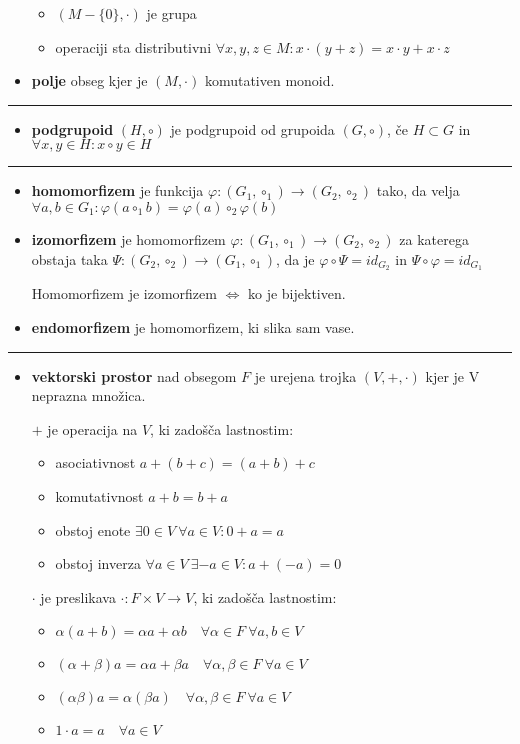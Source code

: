 \documentclass[a4paper,landscape]{article}
\begin{document}
\begin{multicols}{3}
\begin{itemize}
\begin{itemize}
        \item $(M-\{0\},\cdot)$ je grupa
        \item operaciji sta distributivni $\forall x,y,z \in M : x\cdot (y+z) = x\cdot y + x \cdot z$
    \end{itemize}
    \item \textbf{polje} obseg kjer je $(M,\cdot)$ komutativen monoid.
\end{itemize}
\noindent\rule{2cm}{0.4pt}
\begin{itemize}
    \item \textbf{podgrupoid} $(H, \circ)$ je podgrupoid od grupoida $(G, \circ)$, če $H \subset G$ in $\forall x,y \in H : x \circ y \in H$
\end{itemize}
\noindent\rule{2cm}{0.4pt}
\begin{itemize}
    \item \textbf{homomorfizem} je funkcija $\varphi : (G_1, \circ_1) \to (G_2, \circ_2)$ tako, da velja $\forall a,b \in G_1 : \varphi (a \circ_1 b) = \varphi (a) \circ_2 \varphi(b)$
    \item \textbf{izomorfizem} je homomorfizem $\varphi : (G_1, \circ_1) \to (G_2, \circ_2)$ za katerega obstaja taka $\Psi : (G_2, \circ_2) \to (G_1, \circ_1)$, da je $\varphi \circ \Psi = id_{G_2}$ in $\Psi \circ \varphi = id_{G_1}$
    
    Homomorfizem je izomorfizem $\Leftrightarrow$ ko je bijektiven.

    \item \textbf{endomorfizem} je homomorfizem, ki slika sam vase.
\end{itemize}
\noindent\rule{2cm}{0.4pt}
\begin{itemize}
    \item \textbf{vektorski prostor} nad obsegom $F$ je urejena trojka $(V, +, \cdot)$ kjer je V neprazna množica.

    $+$ je operacija na $V$, ki zadošča lastnostim:
    \begin{itemize}
        \item asociativnost $a+(b+c) = (a+b)+c$
        \item komutativnost $a+b = b+a$
        \item obstoj enote $\exists 0 \in V \ \forall a \in V : 0+a = a$
        \item obstoj inverza $\forall a \in V \ \exists -a \in V : a+(-a) = 0$
    \end{itemize}
    $\cdot$ je preslikava $\cdot : F\times V \to V$, ki zadošča lastnostim:
    \begin{itemize}
        \item $\alpha (a+b) = \alpha a + \alpha b \quad \forall \alpha \in F \ \forall a,b \in V$
        \item $(\alpha + \beta)a = \alpha a + \beta a \quad \forall \alpha, \beta \in F \ \forall a\in V$
        \item $(\alpha \beta)a = \alpha (\beta a) \quad \forall \alpha, \beta \in F \ \forall a\in V$
        \item $1 \cdot a = a \quad \forall a \in V$
    \end{itemize}


\end{itemize}
\end{multicols}
\end{document}
